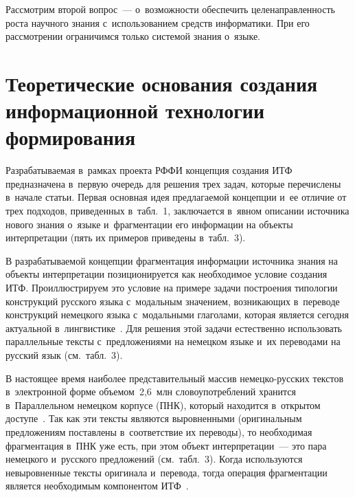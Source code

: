 \begin{multicols}{2}
  Рассмотрим второй вопрос~--- о~воз\-мож\-ности обеспечить 
целенаправленность роста научного знания с~использованием средств 
информатики. При его рассмотрении ограничимся только сис\-те\-мой знания 
о~языке.

\vspace*{-6pt}

\section{Теоретические основания создания информационной технологии формирования}

\vspace*{-2pt}
    
  Разрабатываемая в~рамках проекта РФФИ концепция создания ИТФ 
предназначена в~первую очередь для решения трех задач, 
которые перечислены в~начале статьи. Первая основная идея пред\-ла\-га\-емой 
концепции и~ее отличие от 
трех подходов, приведенных в~табл.~1, заключается в~явном описании 
источника нового знания о~языке и~фрагментации его информации на объекты 
интерпретации (пять их примеров приведены в~табл.~3).
  

  
  В разрабатываемой концепции фрагментация информации источника знания 
на объекты интерпретации позиционируется как необходимое условие создания 
ИТФ. Проиллюстрируем это условие на примере задачи построения типологии 
конструк\-ций русского языка с~модальным значением, возникающих в~переводе 
конструкций немецкого языка с~модальными глаголами, которая является 
сегодня актуальной в~лингвистике~\cite{13-zat}. Для решения этой задачи 
естественно использовать параллельные тексты с~предложениями на немецком 
языке и~их переводами на русский язык (см.\ табл.~3).
  
  В настоящее время наиболее представительный массив не\-мец\-ко-рус\-ских 
текстов в~электронной форме объемом~2,6~млн словоупотреблений хранится 
в~Параллельном немецком корпусе (ПНК), который находится в~открытом 
доступе~\cite{14-zat}. Так как эти тексты являются выровненными 
(оригинальным предложениям поставлены в~соответствие их переводы), то 
необходимая фрагментация в~ПНК уже есть, при этом объект  
интерпретации~--- это пара немецкого и~русского предложений (см.\ табл.~3). Когда 
используются невыровненные тексты оригинала и~перевода, тогда операция 
фрагментации является необходимым компонентом ИТФ~\cite{15-zat}.



\setcounter{table}{4}
\begin{table*}\small %
\begin{center}
\vspace*{2ex}


\end{center}
\end{table*}
\end{multicols}
